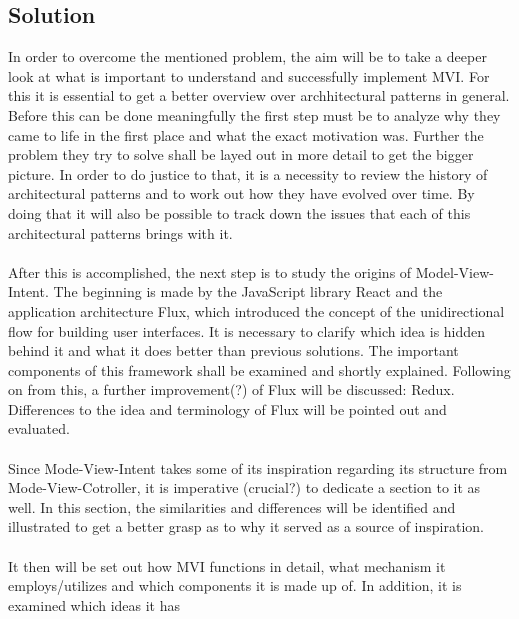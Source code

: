 \subsection{Solution}
\label{subsec:solution}



\newpage
In order to overcome the mentioned problem, the aim will be to take a deeper look at what is important to understand and successfully implement MVI.
For this it is essential to get a better overview over archhitectural patterns in general. Before this can be done meaningfully the first step must be 
to analyze why they came to life in the first place and what the exact motivation was. Further the problem they try to solve shall be layed out in more detail to 
get the bigger picture. In order to do justice to that, it is a necessity to review the history of architectural patterns and to work out how they have evolved over time.
By doing that it will also be possible to track down the issues that each of this architectural patterns brings with it.
\\
\\
After this is accomplished, the next step is to study the origins of Model-View-Intent. The beginning is made by the JavaScript library React and the application architecture
Flux, which introduced the concept of the unidirectional flow for building user interfaces. It is necessary to clarify which idea is hidden behind it and what it does
better than previous solutions. The important components of this framework shall be examined and shortly explained. Following on from this, a further improvement(?) of Flux will 
be discussed: Redux. Differences to the idea and terminology of Flux will be pointed out and evaluated.
\\
\\
Since Mode-View-Intent takes some of its inspiration regarding its structure from Mode-View-Cotroller, it is imperative (crucial?) to dedicate a section to it as well.
In this section, the similarities and differences will be identified and illustrated to get a better grasp as to why it served as a source of inspiration.
\\
\\
It then will be set out how MVI functions in detail, what mechanism it employs/utilizes and which components it is made up of. In addition, it is examined which ideas it has 
